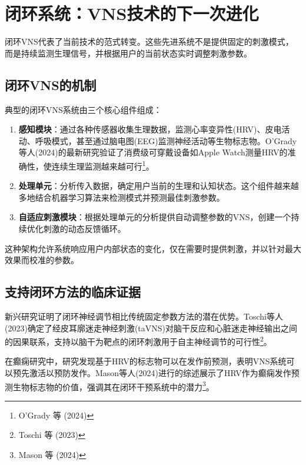\documentclass[
  Letterpaper,
]{scrbook}
\begin{document}
\section{闭环系统：VNS技术的下一次进化}\label{ux95edux73afux7cfbux7edfvnsux6280ux672fux7684ux4e0bux4e00ux6b21ux8fdbux5316}

闭环VNS代表了当前技术的范式转变。这些先进系统不是提供固定的刺激模式，而是持续监测生理信号，并根据用户的当前状态实时调整刺激参数。

\subsection{闭环VNS的机制}\label{ux95edux73afvnsux7684ux673aux5236}

典型的闭环VNS系统由三个核心组件组成：

\begin{enumerate}
\def\labelenumi{\arabic{enumi}.}
\item
  \textbf{感知模块}：通过各种传感器收集生理数据，监测心率变异性(HRV)、皮电活动、呼吸模式，甚至通过脑电图(EEG)监测神经活动等生物标志物。O'Grady等人(2024)的最新研究验证了消费级可穿戴设备如Apple
  Watch测量HRV的准确性，使连续生理监测越来越可行\footnote{O'Grady 等
    (2024)}。
\item
  \textbf{处理单元}：分析传入数据，确定用户当前的生理和认知状态。这个组件越来越多地结合机器学习算法来检测模式并预测最佳刺激参数。
\item
  \textbf{自适应刺激模块}：根据处理单元的分析提供自动调整参数的VNS，创建一个持续优化刺激的动态反馈循环。
\end{enumerate}

这种架构允许系统响应用户内部状态的变化，仅在需要时提供刺激，并以针对最大效果而校准的参数。

\subsection{支持闭环方法的临床证据}\label{ux652fux6301ux95edux73afux65b9ux6cd5ux7684ux4e34ux5e8aux8bc1ux636e}

新兴研究证明了闭环神经调节相比传统固定参数方法的潜在优势。Toschi等人(2023)确定了经皮耳廓迷走神经刺激(taVNS)对脑干反应和心脏迷走神经输出之间的因果联系，支持以脑干为靶点的闭环刺激用于自主神经调节的可行性\footnote{Toschi
  等 (2023)}。

在癫痫研究中，研究发现基于HRV的标志物可以在发作前预测，表明VNS系统可以预先激活以预防发作。Mason等人(2024)进行的综述展示了HRV作为癫痫发作预测生物标志物的价值，强调其在闭环干预系统中的潜力\footnote{Mason
  等 (2024)}。
\end{document}
